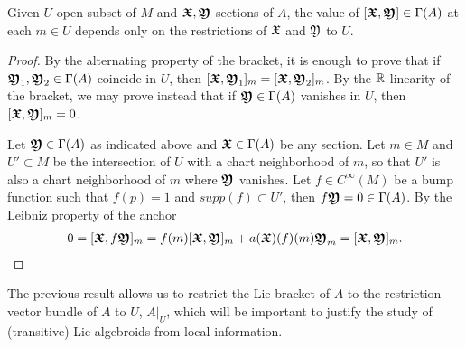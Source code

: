 



\begin{proposition}\label{bracketIsLocal}
Given $U$ open subset of $M$ and $\bm{\mathfrak{X}}, \bm{\mathfrak{Y}}$ sections of $A$, the value of $[\bm{\mathfrak{X}}, \bm{\mathfrak{Y}}] \in \Gamma(A)$ at each $m \in U$ depends only on the restrictions of $\mathfrak{X}$ and $\mathfrak{Y}$ to $U$.
\end{proposition}
\begin{proof}
By the alternating property of the bracket, it is enough to prove that if $\bm{\mathfrak{Y}}_1, \bm{\mathfrak{Y}}_2 \in \Gamma(A)$ coincide in $U$, then $[\bm{\mathfrak{X}}, \bm{\mathfrak{Y}}_1]_m = [\bm{\mathfrak{X}}, \bm{\mathfrak{Y}}_2]_m$. By the $\mathbb{R}$-linearity of the bracket, we may prove instead that if $\bm{\mathfrak{Y}} \in \Gamma(A)$ vanishes in $U$, then $[\bm{\mathfrak{X}}, \bm{\mathfrak{Y}}]_m = 0$.

Let $\bm{\mathfrak{Y}} \in \Gamma(A)$ as indicated above and $\bm{\mathfrak{X}} \in \Gamma(A)$ be any section. Let $m \in M$ and $U' \subset M$ be the intersection of $U$ with a chart neighborhood of $m$, so that $U'$ is also a chart neighborhood of $m$ where $\bm{\mathfrak{Y}}$ vanishes. Let $f \in C^\infty(M)$ be a bump function such that $f(p) = 1$ and $supp(f) \subset U'$, then $f \bm{\mathfrak{Y}} = 0 \in \Gamma(A)$. By the Leibniz property of the anchor
\begin{align*}
    0 = [\bm{\mathfrak{X}}, f \bm{\mathfrak{Y}}]_m = f(m) [\bm{\mathfrak{X}}, \bm{\mathfrak{Y}}]_m + a(\bm{\mathfrak{X}})(f)(m) \bm{\mathfrak{Y}}_m = [\bm{\mathfrak{X}}, \bm{\mathfrak{Y}}]_m.
\end{align*}
\end{proof}
The previous result allows us to restrict the Lie bracket of $A$ to the restriction vector bundle of $A$ to $U$, $A|_U$, which will be important to justify the study of (transitive) Lie algebroids from local information. 

